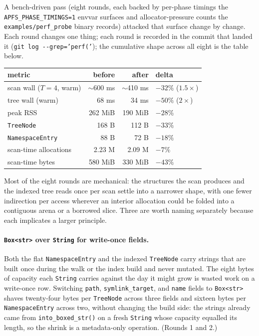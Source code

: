 A bench-driven pass (eight rounds, each backed by per-phase
timings the \texttt{APFS\_PHASE\_TIMINGS=1} envvar surfaces and
allocator-pressure counts the \texttt{examples/perf\_probe}
binary records) attacked that surface change by change. Each
round changes one thing; each round is recorded in the commit
that landed it (\texttt{git log -{}-grep='perf('}); the cumulative
shape across all eight is the table below.

\begin{center}
\begin{tabular}{lrrl}
\toprule
metric & before & after & delta \\
\midrule
scan wall ($T=4$, warm) & $\sim$600 ms     & $\sim$410 ms     & $-32\%$ ($1.5\times$) \\
tree wall (warm)        &       68 ms      &       34 ms      & $-50\%$ ($2\times$)   \\
peak RSS                &      262 MiB     &      190 MiB     & $-28\%$ \\
\texttt{TreeNode}       &      168 B       &      112 B       & $-33\%$ \\
\texttt{NamespaceEntry} &       88 B       &       72 B       & $-18\%$ \\
scan-time allocations   &      2.23 M      &      2.09 M      & $-7\%$  \\
scan-time bytes         &      580 MiB     &      330 MiB     & $-43\%$ \\
\bottomrule
\end{tabular}
\end{center}

Most of the eight rounds are mechanical: the structures the scan
produces and the indexed tree reads once per scan settle into a
narrower shape, with one fewer indirection per access wherever an
interior allocation could be folded into a contiguous arena or a
borrowed slice. Three are worth naming separately because each
implicates a larger principle.

\paragraph{\texttt{Box<str>} over \texttt{String} for write-once
fields.} Both the flat \texttt{NamespaceEntry} and the indexed
\texttt{TreeNode} carry strings that are built once during the
walk or the index build and never mutated. The eight bytes of
capacity each \texttt{String} carries against the day it might
grow is wasted work on a write-once row. Switching \texttt{path},
\texttt{symlink\_target}, and \texttt{name} fields to
\texttt{Box<str>} shaves twenty-four bytes per \texttt{TreeNode}
across three fields and sixteen bytes per \texttt{NamespaceEntry}
across two, without changing the build side: the strings already
came from \texttt{into\_boxed\_str()} on a fresh \texttt{String}
whose capacity equalled its length, so the shrink is a
metadata-only operation. (Rounds 1 and 2.)

